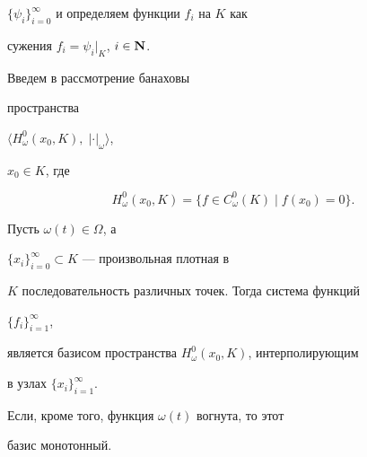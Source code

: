 $\{\psi_i\}^\infty_{i=0}$ и определяем функции $f_i$ на $K$ как


сужения $f_i=\psi_i|_K$, $i\in\bold N$.


Введем в рассмотрение банаховы


пространства


$\langle H^0_\omega(x_0,K),\;|\cdot|_\omega\rangle$,


$x_0\in K$, где


$$


H^0_\omega(x_0,K)=\{f\in C^0_\omega(K)\mid f(x_0)=0\}.


$$





\begin{thm} Пусть $\omega(t)\in\Omega$, а


$\{x_i\}^\infty_{i=0}\subset K$ --- произвольная плотная в


$K$ последовательность различных точек. Тогда система функций


$\{f_i\}^\infty_{i=1}$,


является базисом пространства $H^0_\omega(x_0,K)$, интерполирующим


в узлах $\{x_i\}^\infty_{i=1}$.


Если, кроме того, функция $\omega(t)$ вогнута, то этот


базис монотонный.


\end{thm}





